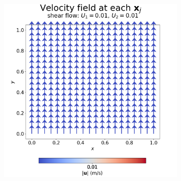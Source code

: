                 \begin{figure}
                    \begin{subfigure}{0.4\textwidth}
                        \centering
                        \includegraphics[width=\textwidth]{diagrams/results-mri/simple-tests/mri-spins_quiver_2D_shear_test_3.png}
                        \caption{}
                        \label{fig:mri-shear-3:quiver}
                    \end{subfigure}
                    \vspace{4mm} %
                    \begin{subfigure}{0.4\textwidth}
                        \centering

\end{subfigure}
\end{figure}
